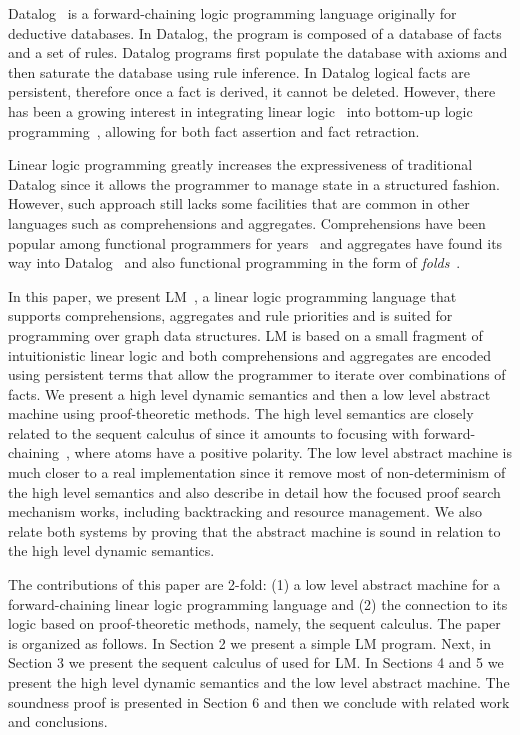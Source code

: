 
Datalog~\cite{Ramakrishnan93asurvey} is a forward-chaining logic programming
language originally for deductive databases. In Datalog, the program is composed
of a database of facts and a set of rules. Datalog programs first populate the
database with axioms and then saturate the database using rule inference. In
Datalog logical facts are persistent, therefore once a fact is derived, it
cannot be deleted. However, there has been a growing interest in integrating
linear logic~\cite{girard-87} into bottom-up logic
programming~\cite{Chang03ajudgmental,cruz-iclp14,Lopez:2005:MCL:1069774.1069778,simmons-lla},
allowing for both fact assertion and fact retraction.

Linear logic programming greatly increases the expressiveness of traditional
Datalog since it allows the programmer to manage state in a structured fashion.
However, such approach still lacks some facilities that are common in other
languages such as comprehensions and aggregates. Comprehensions have been
popular among functional programmers for years~\cite{npl1977} and aggregates
have found its way into
Datalog~\cite{Consens93lowcomplexity,Greco:1999:DPD:627321.627989} and also
functional programming in the form of
\emph{folds}~\cite{Hutton:1999:TUE:968578.968579}.

In this paper, we present LM~\cite{cruz-iclp14}, a linear logic programming
language that supports comprehensions, aggregates and rule priorities and is
suited for programming over graph data structures. LM is based on a small
fragment of intuitionistic linear logic and both comprehensions and aggregates
are encoded using persistent terms that allow the programmer to iterate over
combinations of facts. We present a high level dynamic semantics and then a low
level abstract machine using proof-theoretic methods. The high level semantics
are closely related to the sequent calculus of since it amounts to focusing with
forward-chaining~\cite{Andreoli92logicprogramming,laurent2004proof}, where atoms
have a positive polarity.  The low level abstract machine is much closer to a
real implementation since it remove most of non-determinism of the high level
semantics and also describe in detail how the focused proof search mechanism
works, including backtracking and resource management. We also relate both
systems by proving that the abstract machine is sound in relation to the high
level dynamic semantics.

The contributions of this paper are 2-fold: (1) a low level abstract machine for
a forward-chaining linear logic programming language and (2) the connection to
its logic based on proof-theoretic methods, namely, the sequent calculus.  The
paper is organized as follows. In Section 2 we present a simple LM program.
Next, in Section 3 we present the sequent calculus of used for LM. In Sections 4
and 5 we present the high level dynamic semantics and the low level abstract
machine. The soundness proof is presented in Section 6 and then we conclude with
related work and conclusions.
